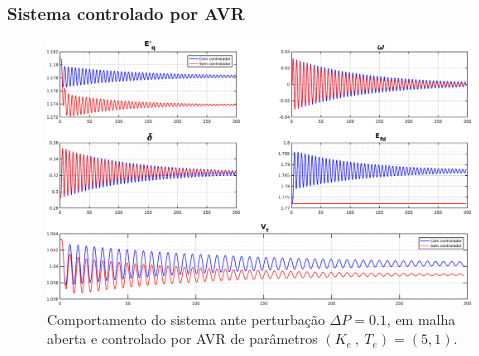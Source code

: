 \documentclass[10pt, compress,xcolor={svgnames,dvipsnames,x11names}]{beamer}
\begin{document}
\begin{frame}%
\frametitle{Sistema controlado por AVR}
\scriptsize

\begin{figure}[htb]
	\begin{center}
	    \includegraphics[width = 1\columnwidth]{../images/presentation/resultadosAVR.pdf}
	\end{center}
	\caption{\label{fig::resultadosAVR} Comportamento do sistema ante perturbação $\Delta P = 0.1$, em malha aberta e controlado por AVR de parâmetros $\left(K_e\ ,\ T_e\right) = \left(5,1\right)$.}
\end{figure}

\normalsize
\end{frame}%
\end{document}
